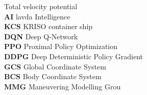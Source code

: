 \abbreviations
\noindent
{}   \> Total velocity potential \\
\textbf{AI}   \> lavda  Intelligence \\
\textbf{KCS} \> KRISO container ship\\
\textbf{DQN} \>Deep Q-Network \\
\textbf{PPO} \> Proximal Policy Optimization \\
\textbf{DDPG}   \> Deep Deterministic Policy Gradient \\
\textbf{GCS} \> Global Coordinate System \\
\textbf{BCS} \> Body Coordinate System \\
 \textbf{MMG} \> Maneuvering Modelling Grou